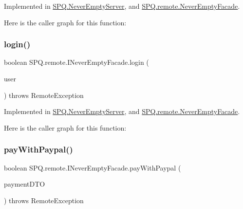 Implemented in \mbox{\hyperlink{class_s_p_q_1_1_never_empty_server_abb18bd0d72ecb8790068f206c592c58d}{S\+P\+Q.\+Never\+Empty\+Server}}, and \mbox{\hyperlink{class_s_p_q_1_1remote_1_1_never_empty_facade_a32679a25e12c8a33e84087de357cd616}{S\+P\+Q.\+remote.\+Never\+Empty\+Facade}}.

Here is the caller graph for this function\+:
\mbox{\label{interface_s_p_q_1_1remote_1_1_i_never_empty_facade_a2440fa36695c63e4e4c30fc25965f853}} 
\subsubsection{\texorpdfstring{login()}{login()}}
{\footnotesize\ttfamily boolean S\+P\+Q.\+remote.\+I\+Never\+Empty\+Facade.\+login (\begin{DoxyParamCaption}\item[{\mbox{\hyperlink{class_s_p_q_1_1dto_1_1_user_d_t_o}{User\+D\+TO}}}]{user }\end{DoxyParamCaption}) throws Remote\+Exception}



Implemented in \mbox{\hyperlink{class_s_p_q_1_1_never_empty_server_a79e3b01cc25be204f24e01c7fccbef13}{S\+P\+Q.\+Never\+Empty\+Server}}, and \mbox{\hyperlink{class_s_p_q_1_1remote_1_1_never_empty_facade_a3fdd96efa1256ea520a497b8a20578e8}{S\+P\+Q.\+remote.\+Never\+Empty\+Facade}}.

Here is the caller graph for this function\+:
\mbox{\label{interface_s_p_q_1_1remote_1_1_i_never_empty_facade_a2d34c64f91537d8c7138094e418de785}} 
\subsubsection{\texorpdfstring{pay\+With\+Paypal()}{payWithPaypal()}}
{\footnotesize\ttfamily boolean S\+P\+Q.\+remote.\+I\+Never\+Empty\+Facade.\+pay\+With\+Paypal (\begin{DoxyParamCaption}\item[{\mbox{\hyperlink{class_s_p_q_1_1dto_1_1_payment_d_t_o}{Payment\+D\+TO}}}]{payment\+D\+TO }\end{DoxyParamCaption}) throws Remote\+Exception}



